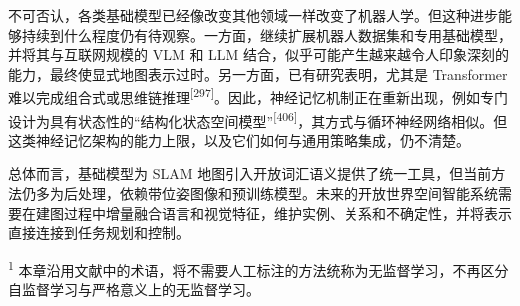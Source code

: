 不可否认，各类基础模型已经像改变其他领域一样改变了机器人学。但这种进步能够持续到什么程度仍有待观察。一方面，继续扩展机器人数据集和专用基础模型，并将其与互联网规模的 VLM 和 LLM 结合，似乎可能产生越来越令人印象深刻的能力，最终使显式地图表示过时。另一方面，已有研究表明，尤其是 Transformer 难以完成组合式或思维链推理\textsuperscript{[297]}。因此，神经记忆机制正在重新出现，例如专门设计为具有状态性的“结构化状态空间模型”\textsuperscript{[406]}，其方式与循环神经网络相似。但这类神经记忆架构的能力上限，以及它们如何与通用策略集成，仍不清楚。

总体而言，基础模型为 SLAM 地图引入开放词汇语义提供了统一工具，但当前方法仍多为后处理，依赖带位姿图像和预训练模型。未来的开放世界空间智能系统需要在建图过程中增量融合语言和视觉特征，维护实例、关系和不确定性，并将表示直接连接到任务规划和控制。

\textsuperscript{1} 本章沿用文献中的术语，将不需要人工标注的方法统称为无监督学习，不再区分自监督学习与严格意义上的无监督学习。
